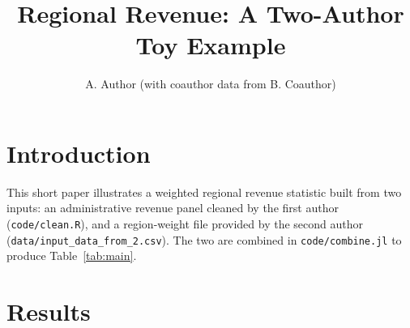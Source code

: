 \documentclass{article}
\title{Regional Revenue: A Two-Author Toy Example}
\author{A. Author (with coauthor data from B. Coauthor)}
\begin{document}
\maketitle

\section{Introduction}

This short paper illustrates a weighted regional revenue statistic built
from two inputs: an administrative revenue panel cleaned by the first
author (\texttt{code/clean.R}), and a region-weight file provided by the
second author (\texttt{data/input\_data\_from\_2.csv}). The two are
combined in \texttt{code/combine.jl} to produce Table~\ref{tab:main}.

\section{Results}

\begin{table}[h]
\centering

\caption{Average regional revenue (weighted)}
\label{tab:main}
\end{table}
\end{document}

